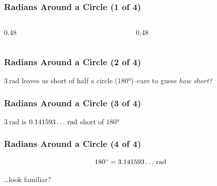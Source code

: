 \begin{frame}
	\frametitle{Radians Around a Circle (1 of 4)}

    \begin{columns}
        \begin{column}{0.48\linewidth}
            \centering
            \resizebox{\linewidth}{!}{
                
            }
        \end{column}
        \begin{column}{0.48\linewidth}
            \centering
            \resizebox{\linewidth}{!}{
                
            }
        \end{column}
    \end{columns}
\end{frame}

\begin{frame}
	\frametitle{Radians Around a Circle (2 of 4)}

    \centering
    \resizebox{0.5\linewidth}{!}{
        
    }

    \vspace{0.5em}
    {\footnotesize $\qty{3}{\radian}$ leaves us short of half a circle ($\ang{180}$)--care to guess \emph{how short?}\par}
\end{frame}

\begin{frame}
	\frametitle{Radians Around a Circle (3 of 4)}

    \centering
    \resizebox{0.5\linewidth}{!}{
        
    }

    \vspace{0.5em}
    {\footnotesize $\qty{3}{\radian}$ is $\qty[parse-numbers = false]{0.141593\dots}{\radian}$ short of $\ang{180}$\par}
\end{frame}

\begin{frame}
	\frametitle{Radians Around a Circle (4 of 4)}

    \centering
    \[\ang{180} = \qty[parse-numbers = false]{3.141593\dots}{\radian}\]

    \vspace{0.25in}
    {\Large \dots{}look familiar?}
\end{frame}

